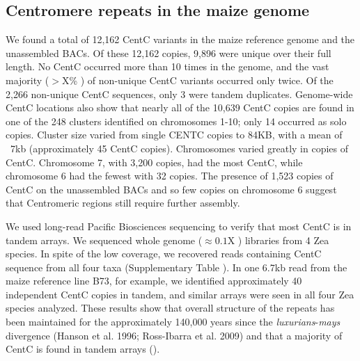 \subsection*{Centromere repeats in the maize genome}

We found a total of 12,162 CentC variants in the maize reference genome and the unassembled BACs.  Of these 12,162 copies, 9,896 were unique over their full length. No CentC occurred more than 10 times in the genome, and the vast majority ($>$X\% ) of non-unique CentC variants occurred only twice.  Of the 2,266 non-unique CentC sequences, only 3 were tandem duplicates.  Genome-wide CentC locations also show that nearly all of the 10,639 CentC copies are found in one of the 248 clusters identified on chromosomes 1-10; only 14 occurred as solo copies.  Cluster size varied from single CENTC copies to 84KB, with a mean of ~7kb (approximately 45 CentC copies). Chromosomes varied greatly in copies of CentC.   Chromosome 7, with 3,200 copies, had the most CentC, while chromosome 6 had the fewest with 32 copies.  The presence of 1,523 copies of CentC on the unassembled BACs and so few copies on chromosome 6 suggest that Centromeric regions still require further assembly.  

We used long-read Pacific Biosciences sequencing to verify that most CentC is in tandem arrays. We sequenced whole genome ($\approx 0.1$X ) libraries from 4 Zea species.  In spite of the low coverage, we recovered reads containing CentC sequence from all four taxa (Supplementary Table ).  In one 6.7kb read from the maize reference line B73, for example, we identified approximately 40 independent CentC copies in tandem, and similar arrays were seen in all four Zea species analyzed.  These results show that overall structure of the repeats has been maintained for the approximately 140,000 years since the \emph{luxurians}-\emph{mays} divergence (Hanson et al. 1996; Ross-Ibarra et al. 2009) and that a majority of CentC is found in tandem arrays (). 

